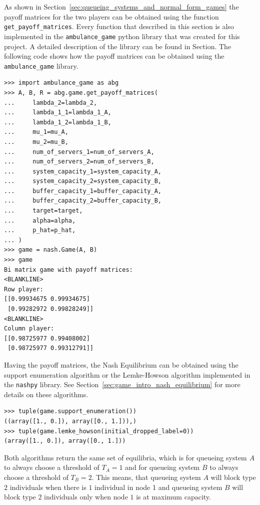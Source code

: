 As shown in Section~\ref{sec:queueing_systems_and_normal_form_games} the payoff
matrices for the two players can be obtained using the function
\lstinline[style=pystyle]{get_payoff_matrices}.
Every function that described in this section is also implemented in the
\lstinline[style=pystyle]{ambulance_game} python library that was created for
this project.
A detailed description of the library can be found in Section.
The following code shows how the payoff matrices can be obtained using the
\lstinline[style=pystyle]{ambulance_game} library.

\begin{lstlisting}[style=pystyle]
>>> import ambulance_game as abg
>>> A, B, R = abg.game.get_payoff_matrices(
...     lambda_2=lambda_2,
...     lambda_1_1=lambda_1_A,
...     lambda_1_2=lambda_1_B,
...     mu_1=mu_A,
...     mu_2=mu_B,
...     num_of_servers_1=num_of_servers_A,
...     num_of_servers_2=num_of_servers_B,
...     system_capacity_1=system_capacity_A,
...     system_capacity_2=system_capacity_B,
...     buffer_capacity_1=buffer_capacity_A,
...     buffer_capacity_2=buffer_capacity_B,
...     target=target,
...     alpha=alpha,
...     p_hat=p_hat,
... )
>>> game = nash.Game(A, B)
>>> game
Bi matrix game with payoff matrices:
<BLANKLINE>
Row player:
[[0.99934675 0.99934675]
 [0.99282972 0.99828249]]
<BLANKLINE>
Column player:
[[0.98725977 0.99408002]
 [0.98725977 0.99312791]]

\end{lstlisting}

Having the payoff matrices, the Nash Equilibrium can be obtained using the
support enumeration algorithm or the Lemke-Howson algorithm implemented in the
\lstinline[style=pystyle]{nashpy} library.
See Section~\ref{sec:game_intro_nash_equilibrium} for more details on these
algorithms.

\begin{lstlisting}[style=pystyle]
>>> tuple(game.support_enumeration())
((array([1., 0.]), array([0., 1.])),)
>>> tuple(game.lemke_howson(initial_dropped_label=0))
(array([1., 0.]), array([0., 1.]))

\end{lstlisting}

Both algorithms return the same set of equilibria, which is for queueing system
\(A\) to always choose a threshold of \(T_A = 1\) and for queueing system
\(B\) to always choose a threshold of \(T_B = 2\).
This means, that queueing system \(A\) will block type \(2\) individuals when
there is \(1\) individual in node 1 and queueing system \(B\) will block type
\(2\) individuals only when node \(1\) is at maximum capacity.

